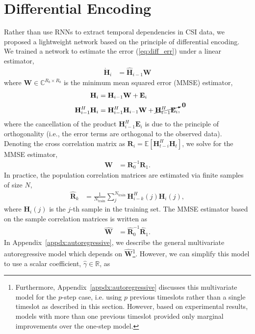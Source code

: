\section{Differential Encoding} \label{sect:diff-enc}

Rather than use RNNs to extract temporal dependencies in CSI data, we proposed a lightweight network based on the principle of differential encoding. We trained a network to estimate the error (\ref{eq:diff_err}) under a linear estimator, 
\begin{align*}
	\grave{\mathbf H}_i &=  \hat{\mathbf H}_{i-1} \mathbf W
\end{align*}
where $\mathbf W \in \mathbb C^{R_b \times R_b}$ is the minimum mean squared error (MMSE) estimator,
\begin{align*}
	\mathbf H_i &= \mathbf H_{i-1}\mathbf W + \mathbf E_i \\
	\mathbf H_{i-1}^H\mathbf H_i &= \mathbf H_{i-1}^H\mathbf H_{i-1} \mathbf W + \cancelto{\mathbf 0}{\mathbf H_{i-1}^H\mathbf E_i},
\end{align*}
where the cancellation of the product $\mathbf H_{i-1}^H\mathbf E_i$ is due to the principle of orthogonality (i.e., the error terms are orthogonal to the observed data). Denoting the cross correlation matrix as $\mathbf R_{i} = \mathbb{E}\left[\mathbf H_{t-i}^H\mathbf H_{t}\right]$, we solve for the MMSE estimator,
\begin{align*}
	\mathbf W &= \mathbf R_0^{-1} \mathbf R_1.
\end{align*}
In practice, the population correlation matrices are estimated
via finite samples of size $N$,
\begin{align*}
	\mathbf{\hat R}_k &= \frac {1}{N_{\text{train}}} \sum_{j}^{N_\text{train}} \mathbf H_{i-k}^H(j)\mathbf H_{i}(j),
\end{align*}
where $\mathbf H_i(j)$ is the $j$-th sample in the training set.
The MMSE estimator based on the sample correlation matrices is written as
\begin{align*}
	\hat{\mathbf W} &= \hat{\mathbf R}_0^{-1} \hat{\mathbf R}_1.
\end{align*}
In Appendix~\ref{appdx:autoregressive}, we describe the general multivariate autoregressive model which depends on $\hat{\mathbf{W}}$\footnote{Furthermore, Appendix~\ref{appdx:autoregressive} discusses this multivariate model for the $p$-step case, i.e. using $p$ previous timeslots rather than a single timeslot as described in this section. However, based on experimental results, models with more than one previous timeslot provided only marginal improvements over the one-step model.}. However, we can simplify this model to use a scalar coefficient, $\hat\gamma \in \mathbb R$, as
